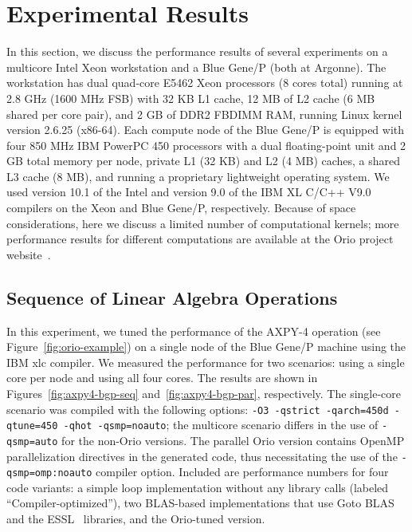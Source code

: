 \section{Experimental Results} 
\label{sec:results} 
 
In this section, we discuss the performance results of several experiments on
a multicore Intel Xeon workstation and a Blue Gene/P (both at Argonne). The
workstation has dual quad-core E5462 Xeon processors (8 cores total) running
at 2.8 GHz (1600 MHz FSB) with 32 KB L1 cache, 12 MB of L2 cache (6 MB shared
per core pair), and 2 GB of DDR2 FBDIMM RAM, running Linux kernel version
2.6.25 (x86-64). Each compute node of the Blue Gene/P is equipped with four
850 MHz IBM PowerPC 450 processors with a dual floating-point unit and 2 GB
total memory per node, private L1 (32 KB) and L2 (4 MB) caches, a shared L3
cache (8 MB), and running a proprietary lightweight operating system. We used
version 10.1 of the Intel and version 9.0 of the IBM XL C/C++ V9.0 compilers
on the Xeon and Blue Gene/P, respectively. Because of space considerations,
here we discuss a limited number of computational kernels; more performance
results for different computations are available at the Orio project
website~\cite{OrioURL}.

\subsection{Sequence of Linear Algebra Operations} 
\label{sec:axpy4-results}
 
In this experiment, we tuned the performance of the AXPY-4 operation (see
Figure~\ref{fig:orio-example}) on a single node of the Blue Gene/P machine
using the IBM xlc compiler.  We measured the performance for two scenarios:
using a single core per node and using all four cores. The results are shown
in Figures~\ref{fig:axpy4-bgp-seq} and~\ref{fig:axpy4-bgp-par},
respectively. The single-core scenario was compiled with the following options:
\texttt{-O3 -qstrict -qarch=450d -qtune=450 -qhot -qsmp=noauto};  the
multicore scenario differs in the use of \texttt{-qsmp=auto} for the non-Orio
versions. The parallel Orio version contains OpenMP parallelization
directives in the generated code, thus necessitating the use of the
\texttt{-qsmp=omp:noauto} compiler option. Included are performance numbers for four
code variants: a simple loop implementation without any library calls
(labeled ``Compiler-optimized''), two BLAS-based implementations that use
Goto BLAS~\cite{Goto:2006fk} and the ESSL~\cite{ESSL} libraries, and the
Orio-tuned version.

